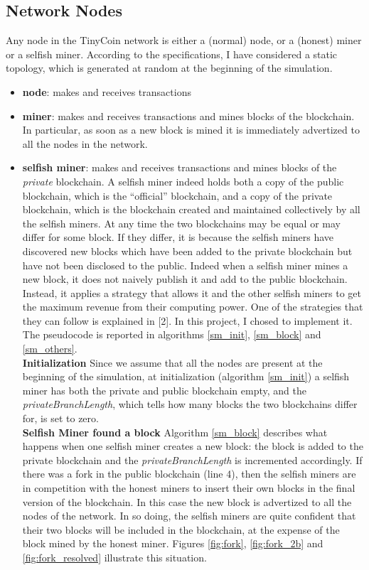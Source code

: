 \documentclass{article}
\begin{document}
\subsection{Network Nodes} Any node in the TinyCoin network is either a (normal) node, or a (honest) miner or a selfish miner. According to the specifications, I have considered a static topology, which is generated at random at the beginning of the simulation.
\begin{itemize}
\item \textbf{node}: makes and receives transactions
\item \textbf{miner}: makes and receives transactions and mines blocks of the blockchain. In particular, as soon as a new block is mined it is immediately advertized to all the nodes in the network.
\item \textbf{selfish miner}: makes and receives transactions and mines blocks of the \textit{private} blockchain. A selfish miner indeed holds both a copy of the public blockchain, which is the ``official'' blockchain, and a copy of the private blockchain, which is the blockchain created and maintained collectively by all the selfish miners. At any time the two blockchains may be equal or may differ for some block. If they differ, it is because the selfish miners have discovered new blocks which have been added to the private blockchain but have not been disclosed to the public. Indeed when a selfish miner mines a new block, it does not naively publish it and add to the public blockchain. Instead, it applies a strategy that allows it and the other selfish miners to get the maximum revenue from their computing power. One of the strategies that they can follow is explained in [2]. In this project, I chosed to implement it. The pseudocode is reported in algorithms \ref{sm_init}, \ref{sm_block} and \ref{sm_others}. \\
\textbf{Initialization} Since we assume that all the nodes are present at the beginning of the simulation, at initialization (algorithm \ref{sm_init}) a selfish miner has both the private and public blockchain empty, and the \textit{privateBranchLength}, which tells how many blocks the two blockchains differ for, is set to zero. \\
\textbf{Selfish Miner found a block} Algorithm \ref{sm_block} describes what happens when one selfish miner creates a new block: the block is added to the private blockchain and the \textit{privateBranchLength} is incremented accordingly. If there was a fork in the public blockchain (line 4), then the selfish miners are in competition with the honest miners to insert their own blocks in the final version of the blockchain. In this case the new block is advertized to all the nodes of the network. In so doing, the selfish miners are quite confident that their two blocks will be included in the blockchain, at the expense of the block mined by the honest miner. Figures \ref{fig:fork}, \ref{fig:fork_2b} and \ref{fig:fork_resolved} illustrate this situation. \\

\end{itemize}
\end{document}
